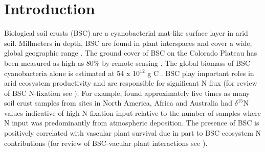 \section{Introduction}


Biological soil crusts (BSC) are a cyanobacterial mat-like surface layer in arid soil. Millmeters in depth, BSC are found in plant interspaces and cover a wide, global geographic range \cite{garcia2003estimates}. The ground cover of BSC on the Colorado Plateau has been measured as high as 80\% by remote sensing \cite{karnieli2001}. The global biomass of BSC cyanobacteria alone is estimated at 54 x 10$^{12}$ g C \cite{garcia2003estimates}. BSC play important roles in arid ecosystem productivity and are responsible for significant N flux (for review of BSC N-fixation see \citet{belnap2003}). For example, \citet{Evans_1999} found approximately five times as many soil crust samples from sites in North America, Africa and Australia had $\delta^{15}$N values indicative of high N-fixation input relative to the number of samples where N input was predominantly from atmospheric deposition. The presence of BSC is positively correlated with vascular plant survival due in part to BSC ecosystem N contributions (for review of BSC-vacular plant interactions see \citet{BelnapVascular}).

